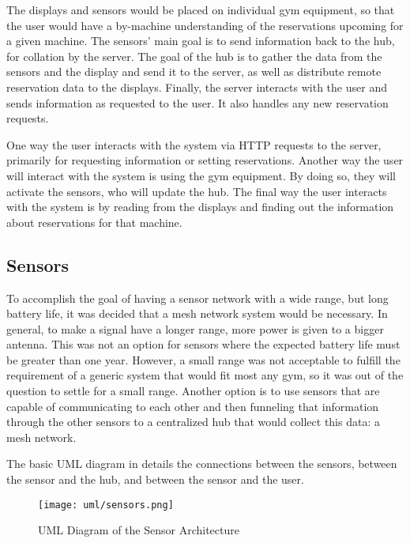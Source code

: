 \documentclass[PPFS.tex]{template/subfiles}
\begin{document}
The displays and sensors would be placed on individual gym equipment, so that the user would have a by-machine understanding of the reservations upcoming for a given machine. The sensors' main goal is to send information back to the hub, for collation by the server. The goal of the hub is to gather the data from the sensors and the display and send it to the server, as well as distribute remote reservation data to the displays. Finally, the server interacts with the user and sends information as requested to the user. It also handles any new reservation requests.

One way the user interacts with the system via HTTP requests to the server, primarily for requesting information or setting reservations. Another way the user will interact with the system is using the gym equipment. By doing so, they will activate the sensors, who will update the hub. The final way the user interacts with the system is by reading from the displays and finding out the information about reservations for that machine.

\subsection{Sensors}

To accomplish the goal of having a sensor network with a wide range, but long battery life, it was decided that a mesh network system would be necessary. In general, to make a signal have a longer range, more power is given to a bigger antenna. This was not an option for sensors where the expected battery life must be greater than one year. However, a small range was not acceptable to fulfill the requirement of a generic system that would fit most any gym, so it was out of the question to settle for a small range. Another option is to use sensors that are capable of communicating to each other and then funneling that information through the other sensors to a centralized hub that would collect this data: a mesh network.

The basic UML diagram in  details the connections between the sensors, between the sensor and the hub, and between the sensor and the user.

\begin{figure}[H]
    \centering
    \texttt{[image: uml/sensors.png]}
    \caption{UML Diagram of the Sensor Architecture}
    \label{fig:sensor_arch}
\end{figure}
\end{document}
